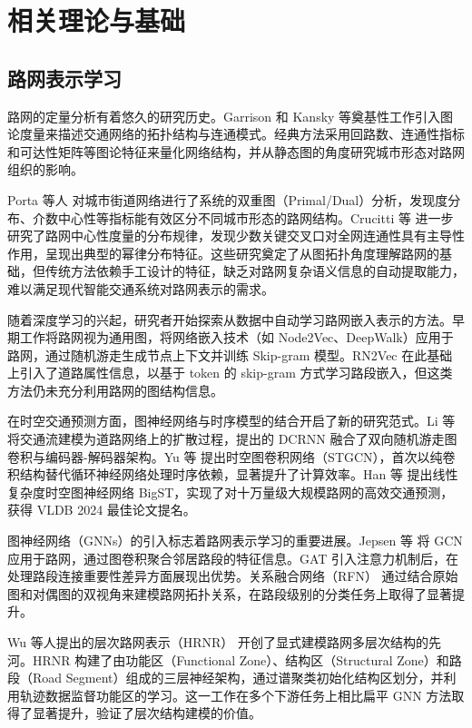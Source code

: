 \chapter{相关理论与基础}

\section{路网表示学习}

路网的定量分析有着悠久的研究历史。Garrison 和 Kansky 等奠基性工作引入图论度量来描述交通网络的拓扑结构与连通模式\cite{Barthelemy2011}。经典方法采用回路数、连通性指标和可达性矩阵等图论特征来量化网络结构，并从静态图的角度研究城市形态对路网组织的影响。

Porta 等人\cite{PortaCrucitti2006a} 对城市街道网络进行了系统的双重图（Primal/Dual）分析，发现度分布、介数中心性等指标能有效区分不同城市形态的路网结构。Crucitti 等\cite{Crucitti2006} 进一步研究了路网中心性度量的分布规律，发现少数关键交叉口对全网连通性具有主导性作用，呈现出典型的幂律分布特征。这些研究奠定了从图拓扑角度理解路网的基础，但传统方法依赖手工设计的特征，缺乏对路网复杂语义信息的自动提取能力，难以满足现代智能交通系统对路网表示的需求。

随着深度学习的兴起，研究者开始探索从数据中自动学习路网嵌入表示的方法。早期工作将路网视为通用图，将网络嵌入技术（如 Node2Vec\cite{Grover2016}、DeepWalk\cite{Perozzi2014}）应用于路网，通过随机游走生成节点上下文并训练 Skip-gram 模型。RN2Vec\cite{wang2019rn2vec} 在此基础上引入了道路属性信息，以基于 token 的 skip-gram 方式学习路段嵌入，但这类方法仍未充分利用路网的图结构信息。

在时空交通预测方面，图神经网络与时序模型的结合开启了新的研究范式。Li 等\cite{li2018dcrnn} 将交通流建模为道路网络上的扩散过程，提出的 DCRNN 融合了双向随机游走图卷积与编码器-解码器架构。Yu 等\cite{yu2018stgcn} 提出时空图卷积网络（STGCN），首次以纯卷积结构替代循环神经网络处理时序依赖，显著提升了计算效率。Han 等\cite{han2024bigst} 提出线性复杂度时空图神经网络 BigST，实现了对十万量级大规模路网的高效交通预测，获得 VLDB 2024 最佳论文提名。

图神经网络（GNNs）的引入标志着路网表示学习的重要进展。Jepsen 等\cite{jepsen2019gcn_road} 将 GCN 应用于路网，通过图卷积聚合邻居路段的特征信息。GAT\cite{velickovic2018gat} 引入注意力机制后，在处理路段连接重要性差异方面展现出优势。关系融合网络（RFN）\cite{Jepsen2022} 通过结合原始图和对偶图的双视角来建模路网拓扑关系，在路段级别的分类任务上取得了显著提升。

Wu 等人提出的层次路网表示（HRNR）\cite{wu2020hrnr} 开创了显式建模路网多层次结构的先河。HRNR 构建了由功能区（Functional Zone）、结构区（Structural Zone）和路段（Road Segment）组成的三层神经架构，通过谱聚类初始化结构区划分，并利用轨迹数据监督功能区的学习。这一工作在多个下游任务上相比扁平 GNN 方法取得了显著提升，验证了层次结构建模的价值。

